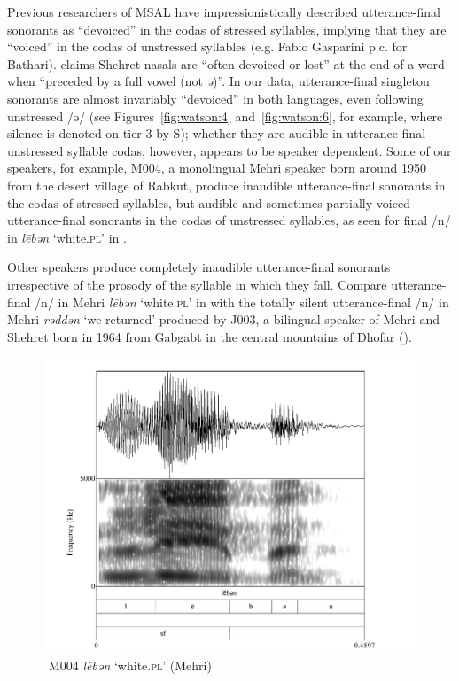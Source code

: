 \documentclass[output=paper]{langscibook}
\begin{document}
Previous researchers of MSAL have impressionistically described utterance-final sonorants as ``devoiced'' in the codas of stressed syllables, implying that they are ``voiced'' in the codas of unstressed syllables (e.g. Fabio Gasparini p.c. for Bathari). \citet[37]{Rubin2014} claims Shehret nasals are ``often devoiced or lost'' at the end of a word when ``preceded by a full vowel (not \textit{ə})''. In our data, utterance-final singleton sonorants are almost invariably ``devoiced'' in both languages, even following unstressed \mbox{/ə/} (see Figures~\ref{fig:watson:4} and~\ref{fig:watson:6}, for example, where silence is denoted on tier 3 by S); whether they are audible in utterance-final unstressed syllable codas, however, appears to be speaker dependent. Some of our speakers, for example, M004, a monolingual Mehri speaker born around 1950 from the desert village of Rabkut, produce inaudible utterance-final sonorants in the codas of stressed syllables, but audible and sometimes partially voiced utterance-final sonorants in the codas of unstressed syllables, as seen for final \mbox{/n/} in \textit{lēbən} ‘white.\textsc{pl}’ in .

\largerpage[2]
Other speakers produce completely inaudible utterance-final sonorants irrespective of the prosody of the syllable in which they fall. Compare utterance-final \mbox{/n/} in Mehri \textit{lēbən} ‘white.\textsc{pl}’ in  with the totally silent utterance-final \mbox{/n/} in Mehri \textit{rəddən} ‘we returned’ produced by J003, a bilingual speaker of Mehri and Shehret born in 1964 from Gabgabt in the central mountains of Dhofar ().
\clearpage

\begin{figure}[p]
\includegraphics[height=.4\textheight]{figures/a12Watsonetal-img005.png}
\caption{
  \label{fig:watson:5} M004 \textit{lēbən} ‘white.\textsc{pl}’ (Mehri)}
\end{figure}
\end{document}
